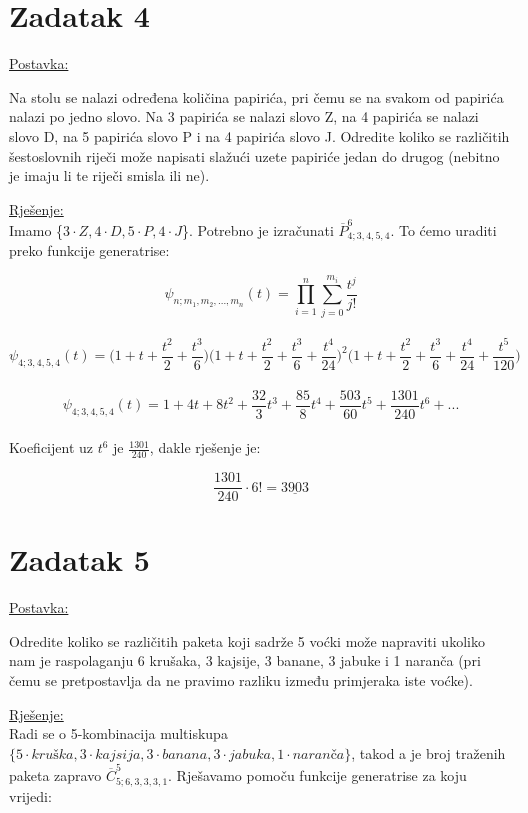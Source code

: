 \documentclass[12pt]{article}
\begin{document}
\section*{Zadatak 4\label{Z4}}	 

\underline{Postavka:}

Na stolu se nalazi određena količina papirića, pri čemu se na svakom od papirića nalazi po jedno slovo. Na 3 papirića se nalazi slovo Z, na 4 papirića se nalazi slovo D, na 5 papirića slovo P i na 4 papirića slovo J. Odredite koliko se različitih šestoslovnih riječi može napisati slažući uzete papiriće jedan do drugog (nebitno je imaju li te riječi smisla ili ne).

\underline{Rješenje:}\\

Imamo \{$3\cdot Z, 4 \cdot D, 5\cdot P, 4\cdot J$\}. Potrebno je izračunati $\overline{P}_{4; 3, 4, 5, 4}^{6}$. To ćemo uraditi preko funkcije generatrise:

$$\psi_{n; m_{1}, m_{2},..., m_{n}}(t) = \prod_{i=1}^{n}\sum_{j=0}^{m_{i}} \frac{t^j}{j!}$$\\
$$\psi_{4; 3, 4, 5, 4}(t) = \bigg(1 + t + \frac{t^2}{2} + \frac{t^3}{6}\bigg)\bigg(1 + t + \frac{t^2}{2} + \frac{t^3}{6} + \frac{t^4}{24}\bigg)^2\bigg(1 + t + \frac{t^2}{2} + \frac{t^3}{6} + \frac{t^4}{24} + \frac{t^5}{120}\bigg)$$\\
$$\psi_{4; 3, 4, 5, 4}(t) =  1 + 4t +  8 t^2 +  \frac{32}{3}t^3 + \frac{85}{8} t^4 +  \frac{503}{60}t^5+\frac{1301}{240} t^6 + ...$$\\

Koeficijent uz $t^6$ je $\frac{1301}{240}$, dakle rješenje je:

$$\frac{1301}{240} \cdot 6! = \underline{3903}$$
\newpage
\section*{Zadatak 5\label{Z5}}	 

\underline{Postavka:}

Odredite koliko se različitih paketa koji sadrže 5 voćki može napraviti ukoliko nam je raspolaganju 6 krušaka, 3 kajsije, 3 banane, 3 jabuke i 1 naranča (pri čemu se pretpostavlja da ne pravimo razliku između primjeraka iste voćke).

\underline{Rješenje:}\\

Radi se o 5-kombinacija multiskupa $ \{5 \cdot kruška, 3\cdot kajsija, 3\cdot banana, 3\cdot jabuka, 1\cdot naranča\}$, takod a je broj traženih paketa zapravo $\overline{C}_{5; 6, 3, 3, 3, 1}^{5}$. Rješavamo pomoču funkcije generatrise za koju vrijedi:
\end{document}
